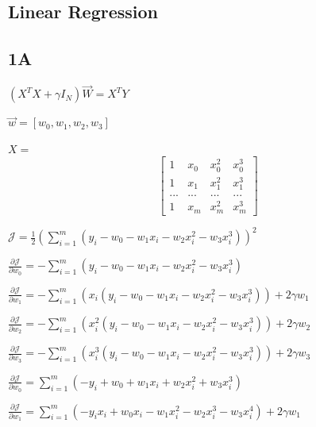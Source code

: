 \documentclass[12pt]{article}
\begin{document}
	\maketitle
	
	\begin{flushleft}
		\section{Linear Regression}
		
		\subsection*{1A}
		$(X^T X + \gamma I_N) \vec{W} = X^TY$
		
		$\vec{w} = [w_0, w_1, w_2, w_3]$
		
		$X = $ \[
		\begin{bmatrix}
		1 & x_0 & x_0^2 & x_0^3 \\
		1 & x_1 & x_1^2 & x_1^3 \\
		... & ... & ... & ...\\
		1 & x_m & x_m^2 & x_m^3
		\end{bmatrix}
		\]
		
		$\mathcal{J} = \frac{1}{2} (\sum_{i=1}^{m} (y_i - w_0 - w_1 x_i - w_2 x_i^2 - w_3 x_i^3))^2$
		
		\vspace{0.5cm}
		
		$\frac{\partial \mathcal{J}}{\partial w_0} = - \sum_{i=1}^{m} (y_i - w_0 - w_1 x_i - w_2 x_i^2 - w_3 x_i^3)$
		
		$\frac{\partial \mathcal{J}}{\partial w_1} = - \sum_{i=1}^{m} (x_i (y_i - w_0 - w_1 x_i - w_2 x_i^2 - w_3 x_i^3)) + 2 \gamma w_1$
		
		$\frac{\partial \mathcal{J}}{\partial w_2} = - \sum_{i=1}^{m} (x_i^2 (y_i - w_0 - w_1 x_i - w_2 x_i^2 - w_3 x_i^3)) + 2 \gamma w_2$
		
		$\frac{\partial \mathcal{J}}{\partial w_3} = - \sum_{i=1}^{m} (x_i^3 (y_i - w_0 - w_1 x_i - w_2 x_i^2 - w_3 x_i^3)) + 2 \gamma w_3$
		
		\vspace{0.5cm}
		
		$\frac{\partial \mathcal{J}}{\partial w_0} = \sum_{i=1}^{m} (- y_i + w_0 + w_1 x_i + w_2 x_i^2 + w_3 x_i^3)$
		
		$\frac{\partial \mathcal{J}}{\partial w_1} = \sum_{i=1}^{m} (- y_i x_i + w_0 x_i - w_1 x_i^2 - w_2 x_i^3 - w_3 x_i^4) + 2 \gamma w_1$
		

\end{flushleft}
\end{document}
